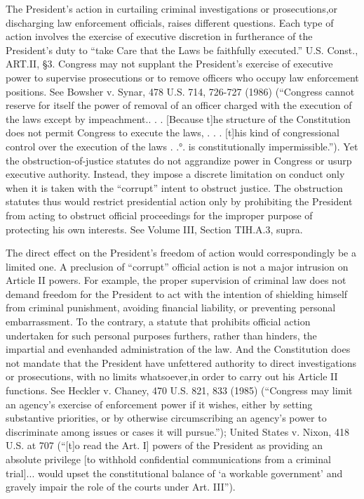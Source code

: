 The President’s action in curtailing criminal investigations or prosecutions,or discharging law enforcement officials, raises different questions.
Each type of action involves the exercise of executive discretion in furtherance of the President’s duty to “take Care that the Laws be faithfully executed.” U.S. Const., ART.II, \S 3.
Congress may not supplant the President’s exercise of executive power to supervise prosecutions or to remove officers who occupy law enforcement positions.
See Bowsher v. Synar, 478 U.S. 714, 726-727 (1986) (“Congress cannot reserve for itself the power of removal of an officer charged with the execution of the laws except by impeachment.. . . [Because t]he structure of the Constitution does not permit Congress to execute the laws, . . . [t]his kind of congressional control over the execution of the laws . .°. is constitutionally impermissible.”).
Yet the obstruction-of-justice statutes do not aggrandize power in Congress or usurp executive authority.
Instead, they impose a discrete limitation on conduct only when it is taken with the “corrupt” intent to obstruct justice.
The obstruction statutes thus would restrict presidential action only by prohibiting the President from acting to obstruct official proceedings for the improper purpose of protecting his own interests.
See Volume III, Section TIH.A.3, supra.

The direct effect on the President’s freedom of action would correspondingly be a limited one.
A preclusion of “corrupt” official action is not a major intrusion on Article II powers.
For example, the proper supervision of criminal law does not demand freedom for the President to act with the intention of shielding himself from criminal punishment, avoiding financial liability, or preventing personal embarrassment.
To the contrary, a statute that prohibits official action undertaken for such personal purposes furthers, rather than hinders, the impartial and evenhanded administration of the law.
And the Constitution does not mandate that the President have unfettered authority to direct investigations or prosecutions, with no limits whatsoever,in order to carry out his Article II functions.
See Heckler v. Chaney, 470 U.S. 821, 833 (1985) (“Congress may limit an agency’s exercise of enforcement power if it wishes, either by setting substantive priorities, or by otherwise circumscribing an agency’s power to discriminate among issues or cases it will pursue.”);
United States v. Nixon, 418 U.S. at 707 (“[t]o read the Art. I] powers of the President as providing an absolute privilege [to withhold confidential communications from a criminal trial]... would upset the constitutional balance of ‘a workable government’ and gravely impair the role of the courts under Art. III”).

